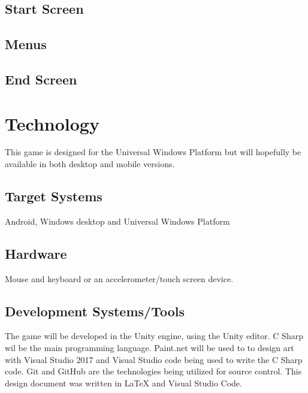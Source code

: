 \documentclass[a4paper]{scrreprt}
\begin{document}
\section{Start Screen}

\section{Menus}

\section{End Screen}



\chapter{Technology}
This game is designed for the Universal Windows Platform but will hopefully be available in both desktop and mobile versions.

\section{Target Systems}
Android, Windows desktop and Universal Windows Platform

\section{Hardware}
Mouse and keyboard or an accelerometer/touch screen device.

\section{Development Systems/Tools}
The game will be developed in the Unity engine, using the Unity editor. C Sharp wil be the main programming language. Paint.net will be used to to design art with Visual Studio 2017 and Visual Studio code being used to write the C Sharp code. Git and GitHub are the technologies being utilized for source control. This design document was written in LaTeX and Visual Studio Code.
\end{document}
